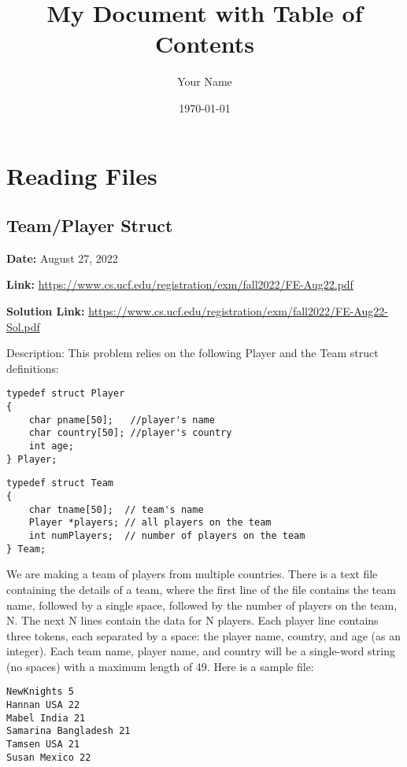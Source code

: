 \documentclass{article}
\begin{document}
\title{My Document with Table of Contents}
\author{Your Name}
\date{\today}

\maketitle

\tableofcontents

\newpage

\section{Reading Files}

\subsection{Team/Player Struct}

\textbf{Date:} August 27, 2022 

\textbf{Link:} \url{https://www.cs.ucf.edu/registration/exm/fall2022/FE-Aug22.pdf} 

\textbf{Solution Link:} \url{https://www.cs.ucf.edu/registration/exm/fall2022/FE-Aug22-Sol.pdf} 

Description: This problem relies on the following Player and the Team struct definitions:

\begin{verbatim}
typedef struct Player
{
    char pname[50];   //player's name
    char country[50]; //player's country
    int age;
} Player;
\end{verbatim}

\begin{verbatim}
typedef struct Team
{
    char tname[50];  // team's name
    Player *players; // all players on the team
    int numPlayers;  // number of players on the team
} Team;
\end{verbatim}


We are making a team of players from multiple countries. There is a text file containing the details of a team, where the first line of the file contains the team name, followed by a single space, followed by the number of players on the team, N. The next N lines contain the data for N players. Each player line contains three tokens, each separated by a space: the player name, country, and age (as an integer). Each team name, player name, and country will be a single-word string (no spaces) with a maximum length of 49. Here is a sample file:

\begin{verbatim}
NewKnights 5 
Hannan USA 22 
Mabel India 21
Samarina Bangladesh 21
Tamsen USA 21 
Susan Mexico 22
\end{verbatim}
\end{document}
